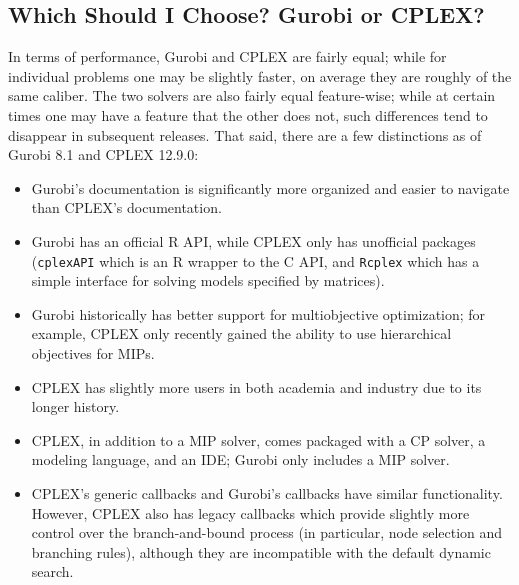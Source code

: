 \documentclass[12pt]{article}
\begin{document}
\subsection{Which Should I Choose? Gurobi or CPLEX?}
In terms of performance, Gurobi and CPLEX are fairly equal; while for individual problems one may be slightly faster, on average they are roughly of the same caliber.
The two solvers are also fairly equal feature-wise; while at certain times one may have a feature that the other does not, such differences tend to disappear in subsequent releases. 
That said, there are a few distinctions as of Gurobi 8.1 and CPLEX 12.9.0:
\begin{itemize}
    \item Gurobi's documentation is significantly more organized and easier to navigate than CPLEX's documentation.
    \item Gurobi has an official R API, while CPLEX only has unofficial packages (\texttt{cplexAPI} which is an R wrapper to the C API, and \texttt{Rcplex} which has a simple interface for solving models specified by matrices).
    \item Gurobi historically has better support for multiobjective optimization; for example, CPLEX only recently gained the ability to use hierarchical objectives for MIPs.
    \item CPLEX has slightly more users in both academia and industry due to its longer history.
    \item CPLEX, in addition to a MIP solver, comes packaged with a CP solver, a modeling language, and an IDE; Gurobi only includes a MIP solver.
    \item CPLEX's generic callbacks and Gurobi's callbacks have similar functionality.
        However, CPLEX also has legacy callbacks which provide slightly more control over the branch-and-bound process (in particular, node selection and branching rules), although they are incompatible with the default dynamic search.
\end{itemize}




\end{document}
